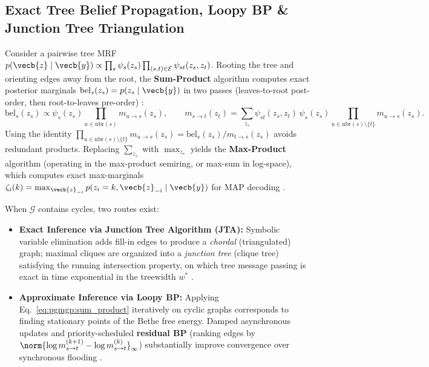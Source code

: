 \documentclass[../../../../master.tex]{subfiles}
\begin{document}
\subsection{Exact Tree Belief Propagation, Loopy BP \& Junction Tree Triangulation}

\begin{coremath}
\label{thm:pgmgp:bp}
Consider a pairwise tree MRF $p(\vecb{z} \mid \vecb{y}) \propto \prod_s \psi_s(z_s) \prod_{(s,t) \in \mathcal{E}} \psi_{st}(z_s, z_t)$. Rooting the tree and orienting edges away from the root, the \textbf{Sum-Product} algorithm computes exact posterior marginals $\mathrm{bel}_s(z_s) = p(z_s \mid \vecb{y})$ in two passes (leaves-to-root post-order, then root-to-leaves pre-order) :
\begin{equation}
\label{eq:pgmgp:sum_product}
\mathrm{bel}_s(z_s) \propto \psi_s(z_s) \prod_{u \in \mathrm{nbr}(s)} m_{u \to s}(z_s),
\qquad
m_{s \to t}(z_t) = \sum_{z_s} \psi_{st}(z_s, z_t) \, \psi_s(z_s) \prod_{u \in \mathrm{nbr}(s) \setminus \{t\}} m_{u \to s}(z_s).
\end{equation}
Using the identity $\prod_{u \in \mathrm{nbr}(s) \setminus \{t\}} m_{u \to s}(z_s) = \mathrm{bel}_s(z_s) / m_{t \to s}(z_s)$ avoids redundant products. Replacing $\sum_{z_s}$ with $\max_{z_s}$ yields the \textbf{Max-Product} algorithm (operating in the max-product semiring, or max-sum in log-space), which computes exact max-marginals $\zeta_i(k) = \max_{\vecb{z}_{-i}} p(z_i = k, \vecb{z}_{-i} \mid \vecb{y})$ for MAP decoding .
\end{coremath}

When $\mathcal{G}$ contains cycles, two routes exist:
\begin{itemize}
  \item \textbf{Exact Inference via Junction Tree Algorithm (JTA):} Symbolic variable elimination adds fill-in edges to produce a \emph{chordal} (triangulated) graph; maximal cliques are organized into a \emph{junction tree} (clique tree) satisfying the running intersection property, on which tree message passing is exact in time exponential in the treewidth $w^*$ .
  \item \textbf{Approximate Inference via Loopy BP:} Applying Eq.~\eqref{eq:pgmgp:sum_product} iteratively on cyclic graphs corresponds to finding stationary points of the Bethe free energy. Damped asynchronous updates and priority-scheduled \textbf{residual BP} (ranking edges by $\norm{\log m_{s \to t}^{(k+1)} - \log m_{s \to t}^{(k)}}_{\infty}$) substantially improve convergence over synchronous flooding .
\end{itemize}
\end{document}
